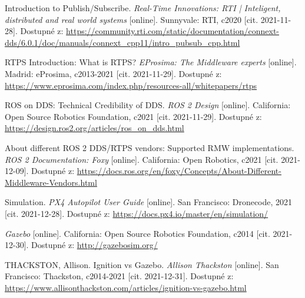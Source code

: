 \begin{thebibliography}{99}
Introduction to Publish/Subscribe. \textit{Real-Time Innovations: RTI | Inteligent, distributed and real world systems} [online]. Sunnyvale: RTI, c2020 [cit. 2021-11-28]. Dostupné z: \href{https://community.rti.com/static/documentation/connext-dds/6.0.1/doc/manuals/connext\_dds/getting\_started/cpp11/intro\_pubsub\_cpp.html}{https://community.rti.com/static/documentation/connext-dds/6.0.1/doc/manuals/connext\_cpp11/intro\_pubsub\_cpp.html}

RTPS Introduction: What is RTPS? \textit{EProsima: The Middleware experts} [online]. Madrid: eProsima, c2013-2021 [cit. 2021-11-29]. Dostupné z: \href{https://www.eprosima.com/index.php/resources-all/whitepapers/rtps}{https://www.eprosima.com/index.php/resources-all/whitepapers/rtps}

ROS on DDS: Technical Credibility of DDS. \textit{ROS 2 Design} [online]. California: Open Source Robotics Foundation, c2021 [cit. 2021-11-29]. Dostupné z: \href{https://design.ros2.org/articles/ros\_on\_dds.html}{https://design.ros2.org/articles/ros\_on\_dds.html}


About different ROS 2 DDS/RTPS vendors: Supported RMW implementations. \textit{ROS 2 Documentation: Foxy} [online]. California: Open Robotics, c2021 [cit. 2021-12-09]. Dostupné z: \href{https://docs.ros.org/en/foxy/Concepts/About-Different-Middleware-Vendors.html}{https://docs.ros.org/en/foxy/Concepts/About-Different-Middleware-Vendors.html}

Simulation. \textit{PX4 Autopilot User Guide} [online]. San Francisco: Dronecode, 2021 [cit. 2021-12-28]. Dostupné z: \href{https://docs.px4.io/master/en/simulation/}{https://docs.px4.io/master/en/simulation/}

\textit{Gazebo} [online]. California: Open Source Robotics Foundation, c2014 [cit. 2021-12-30]. Dostupné z: \href{http://gazebosim.org/}{http://gazebosim.org/}

THACKSTON, Allison. Ignition vs Gazebo. \textit{Allison Thackston} [online]. San Francisco: Thackston, c2014-2021 [cit. 2021-12-31]. Dostupné z: \href{https://www.allisonthackston.com/articles/ignition-vs-gazebo.html}{https://www.allisonthackston.com/articles/ignition-vs-gazebo.html}





\end{thebibliography}
